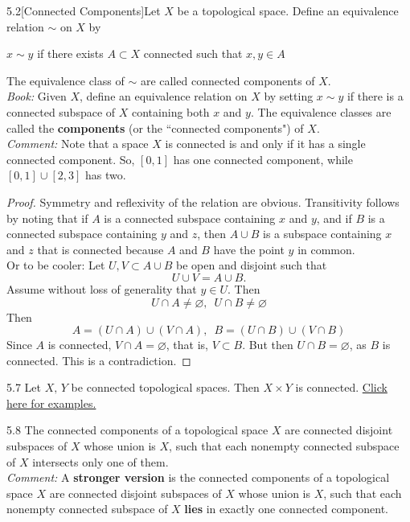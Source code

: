 \begin{customdefinition}{5.2}[Connected Components]Let $X$ be a topological space. Define an equivalence relation $\sim$ on $X$ by 
\begin{center}
    $x \sim y$ if there exists $A \subset X$ connected such that $x,y \in A$
\end{center}
The equivalence class of $\sim$ are called connected components of $X$.\\
\emph{Book:} Given $X$, define an equivalence relation on $X$ by setting $x \sim y$ if there is a connected subspace of $X$ containing both $x$ and $y$. The equivalence classes are called the {\bf components} (or the ``connected components") of $X$.\\
\emph{Comment:} Note that a space $X$ is connected is and only if it has a single connected component. So, $[0, 1]$ has one connected component, while $[0, 1] \cup [2,3]$ has two.
\end{customdefinition}

\begin{proof}
Symmetry and reflexivity of the relation are obvious. Transitivity follows by noting that if $A$ is a connected subspace containing $x$ and $y$, and if $B$ is a connected subspace containing $y$ and $z$, then $A \cup B$ is a subspace containing $x$ and $z$ that is connected because $A$ and $B$ have the point $y$ in common. \\
Or to be cooler: Let $U, V \subset A \cup B$ be open and disjoint such that 
$$U \cup V = A \cup B.$$
Assume without loss of generality that $y \in U$. Then 
$$U \cap A \neq \varnothing, \,\,\, U \cap B \neq \varnothing$$
Then 
$$A = \left(U \cap A\right) \cup \left(V \cap A\right), \,\,\, B = \left(U \cap B\right) \cup \left(V \cap B\right)$$
Since $A$ is connected, $V \cap A = \varnothing$, that is, $V \subset B$. But then $U \cap B = \varnothing$, as $B$ is connected. This is a contradiction.
\end{proof}

\begin{customthm}{5.7}
Let $X,\, Y$ be connected topological spaces. Then $X \times Y$ is connected.
\hypertarget{Theorem_5.7}{\hyperlink{ex.t.5.7}{Click here for examples.}}
\end{customthm}

\begin{customthm}{5.8}
The connected components of a topological space $X$ are connected disjoint subspaces of $X$ whose union is $X$, such that each nonempty connected subspace of $X$ intersects only one of them.\\
\emph{Comment:} A {\bf stronger version} is the connected components of a topological space $X$ are connected disjoint subspaces of $X$ whose union is $X$, such that each nonempty connected subspace of $X$ {\bf lies} in exactly one connected component.
\end{customthm}

